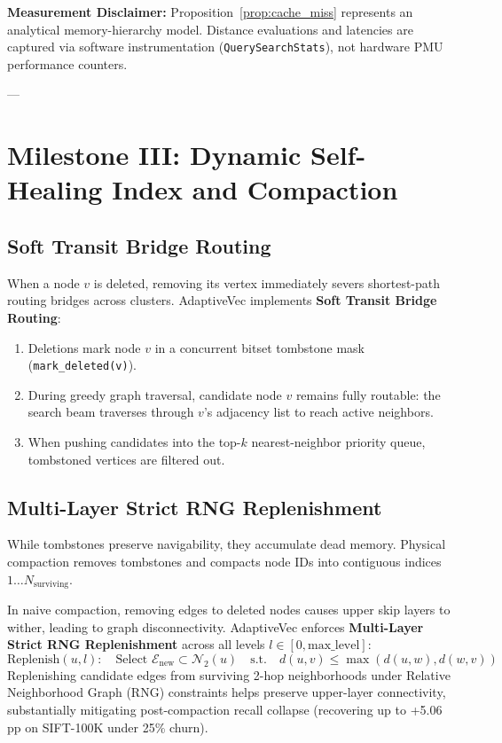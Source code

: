 \documentclass[10pt,journal,compsoc]{IEEEtran}
\begin{document}
\textbf{Measurement Disclaimer:} Proposition~\ref{prop:cache_miss} represents an analytical memory-hierarchy model. Distance evaluations and latencies are captured via software instrumentation (\texttt{QuerySearchStats}), not hardware PMU performance counters.

---

\section{Milestone III: Dynamic Self-Healing Index and Compaction}
\label{sec:maintenance}

\subsection{Soft Transit Bridge Routing}
When a node $v$ is deleted, removing its vertex immediately severs shortest-path routing bridges across clusters. AdaptiveVec implements \textbf{Soft Transit Bridge Routing}:
\begin{enumerate}
    \item Deletions mark node $v$ in a concurrent bitset tombstone mask (\texttt{mark\_deleted(v)}).
    \item During greedy graph traversal, candidate node $v$ remains fully routable: the search beam traverses through $v$'s adjacency list to reach active neighbors.
    \item When pushing candidates into the top-$k$ nearest-neighbor priority queue, tombstoned vertices are filtered out.
\end{enumerate}

\subsection{Multi-Layer Strict RNG Replenishment}
While tombstones preserve navigability, they accumulate dead memory. Physical compaction removes tombstones and compacts node IDs into contiguous indices $1 \dots N_{\text{surviving}}$. 

In naive compaction, removing edges to deleted nodes causes upper skip layers to wither, leading to graph disconnectivity. AdaptiveVec enforces \textbf{Multi-Layer Strict RNG Replenishment} across all levels $l \in [0, \text{max\_level}]$:
\begin{equation}
\text{Replenish}(u, l): \quad \text{Select } \mathcal{E}_{\text{new}} \subset \mathcal{N}_2(u) \quad \text{s.t.} \quad d(u, v) \le \max(d(u, w), d(w, v))
\end{equation}
Replenishing candidate edges from surviving 2-hop neighborhoods under Relative Neighborhood Graph (RNG) constraints helps preserve upper-layer connectivity, substantially mitigating post-compaction recall collapse (recovering up to +5.06 pp on SIFT-100K under 25\% churn).
\end{document}
